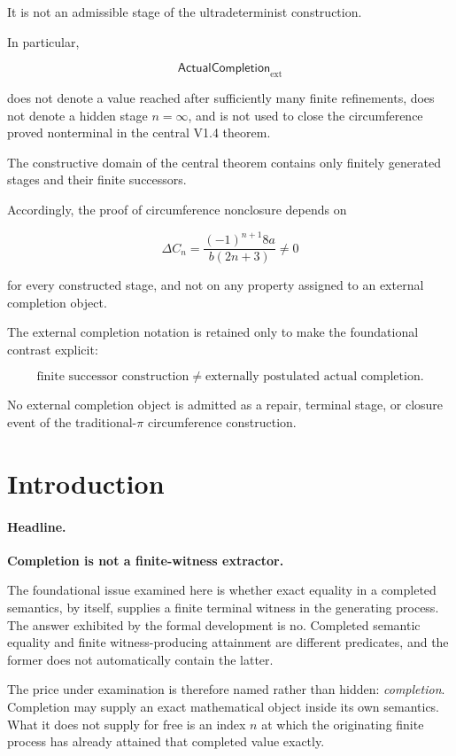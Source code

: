 \documentclass[11pt,a4paper]{article}
\begin{document}
It is not an admissible stage of the ultradeterminist construction.

In particular,

\[
\mathsf{ActualCompletion}_{\mathrm{ext}}
\]

does not denote a value reached after sufficiently many finite
refinements, does not denote a hidden stage \(n=\infty\), and is not
used to close the circumference proved nonterminal in the central
V1.4 theorem.

The constructive domain of the central theorem contains only finitely
generated stages and their finite successors.

Accordingly, the proof of circumference nonclosure depends on

\[
\Delta C_n
=
\frac{(-1)^{n+1}8a}{b(2n+3)}
\neq0
\]

for every constructed stage, and not on any property assigned to an
external completion object.

The external completion notation is retained only to make the
foundational contrast explicit:

\[
\boxed{
\text{finite successor construction}
\neq
\text{externally postulated actual completion}.
}
\]

No external completion object is admitted as a repair, terminal stage,
or closure event of the traditional-\(\pi\) circumference construction.



\section{Introduction}


\paragraph{Headline.}
\textbf{Completion is not a finite-witness extractor.}

The foundational issue examined here is whether exact equality in a
completed semantics, by itself, supplies a finite terminal witness in
the generating process.  The answer exhibited by the formal
development is no.  Completed semantic equality and finite
witness-producing attainment are different predicates, and the former
does not automatically contain the latter.

The price under examination is therefore named rather than hidden:
\emph{completion}.  Completion may supply an exact mathematical object
inside its own semantics.  What it does not supply for free is an
index \(n\) at which the originating finite process has already
attained that completed value exactly.
\end{document}
